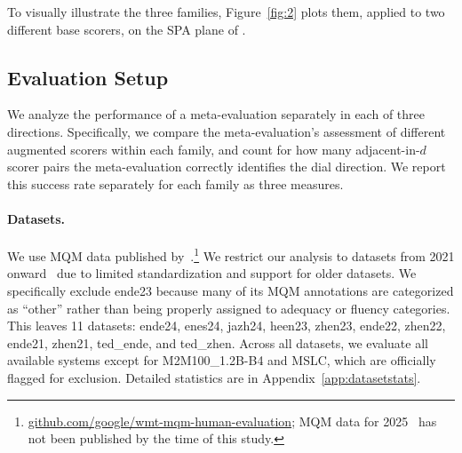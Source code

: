 \documentclass[11pt]{article}
\begin{document}
To visually illustrate the three families,
Figure~\ref{fig:2} plots them, applied to two different
base scorers, on the SPA plane of \citet{shayegh-etal-2025-feeding}.

\subsection{Evaluation Setup}
We analyze the performance of a meta-evaluation separately in each of
three directions. Specifically, we compare the meta-evaluation's assessment of
different augmented scorers within each family, and count for how many
adjacent-in-$d$ scorer pairs the
meta-evaluation correctly identifies the dial direction. We report this
success rate separately for each family as three measures.

\paragraph{Datasets.} We use MQM data published by~\citet{freitag-etal-2021-experts}.\footnote{\href{https://github.com/google/wmt-mqm-human-evaluation}{github.com/google/wmt-mqm-human-evaluation}; MQM data for 2025~\citep{lavie-etal-2025-findings} has not been published by the time of this study.} We restrict our analysis to datasets from 2021 onward~\citep{freitag-etal-2021-results,freitag-etal-2022-results,freitag-etal-2023-results,freitag-etal-2024-llms} due to limited standardization and support for older datasets. We specifically exclude ende23 because many of its MQM annotations are categorized as ``other'' rather than being properly assigned to adequacy or fluency categories. This leaves 11 datasets: ende24, enes24, jazh24, heen23, zhen23, ende22, zhen22, ende21, zhen21, ted\_ende, and ted\_zhen. Across all datasets, we evaluate all available systems except for M2M100\_1.2B-B4 and MSLC, which are officially flagged for exclusion. Detailed statistics are in Appendix~\ref{app:datasetstats}.
\end{document}
